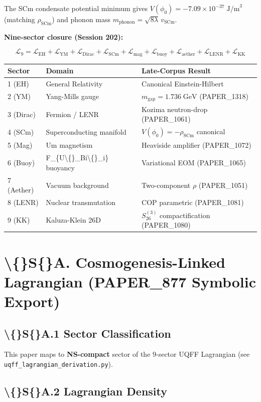 \documentclass[11pt]{article}
\begin{document}
The SCm condensate potential minimum gives $V(\phi_0) = -7.09 \times 10^{-37}\;\text{J/m}^3$ (matching $\rho_{\text{SCm}}$) and phonon mass $m_{\text{phonon}} = \sqrt{8\lambda}\,v_{\text{SCm}}$.

\textbf{Nine-sector closure (Session 202):}

$$\mathcal{L}_{9} = \mathcal{L}_{\text{EH}} + \mathcal{L}_{\text{YM}} + \mathcal{L}_{\text{Dirac}} + \mathcal{L}_{\text{SCm}} + \mathcal{L}_{\text{mag}} + \mathcal{L}_{\text{buoy}} + \mathcal{L}_{\text{aether}} + \mathcal{L}_{\text{LENR}} + \mathcal{L}_{\text{KK}}$$

\begin{center}
\begin{longtable}{lll}
\toprule
Sector & Domain & Late-Corpus Result \tabularnewline
\midrule
\endhead
1 (EH) & General Relativity & Canonical Einstein-Hilbert \tabularnewline
2 (YM) & Yang-Mills gauge & $m_{\text{gap}} = 1.736\;\text{GeV}$ (PAPER\_1318) \tabularnewline
3 (Dirac) & Fermion / LENR & Kozima neutron-drop (PAPER\_1061) \tabularnewline
4 (SCm) & Superconducting manifold & $V(\phi_0) = -\rho_{\text{SCm}}$ canonical \tabularnewline
5 (Mag) & Um magnetism & Heaviside amplifier (PAPER\_1072) \tabularnewline
6 (Buoy) & F\_\{U\textbackslash\{\}\_Bi\textbackslash\{\}\_i\} buoyancy & Variational EOM (PAPER\_1065) \tabularnewline
7 (Aether) & Vacuum background & Two-component $\rho$ (PAPER\_1051) \tabularnewline
8 (LENR) & Nuclear transmutation & COP parametric (PAPER\_1081) \tabularnewline
9 (KK) & Kaluza-Klein 26D & $S_{26}^{(3)}$ compactification (PAPER\_1080) \tabularnewline
\bottomrule
\end{longtable}
\end{center}

\section*{\textbackslash\{\}S\{\}A. Cosmogenesis-Linked Lagrangian (PAPER\_877 Symbolic Export)}

\subsection*{\textbackslash\{\}S\{\}A.1 Sector Classification}

This paper maps to \textbf{NS-compact} sector of the 9-sector UQFF Lagrangian (see \verb|uqff_lagrangian_derivation.py|).

\subsection*{\textbackslash\{\}S\{\}A.2 Lagrangian Density}
\end{document}
